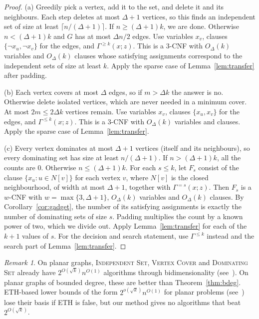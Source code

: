 \documentclass[11pt]{amsart}
\theoremstyle{definition}
\theoremstyle{remark}
\newtheorem{remark}[theorem]{Remark}
\newcommand{\VC}{\textup{\textsc{Vertex Cover}}}
\newcommand{\IS}{\textup{\textsc{Independent Set}}}
\newcommand{\DS}{\textup{\textsc{Dominating Set}}}
\begin{document}
\begin{proof}
(a) Greedily pick a vertex, add it to the set, and delete it and its neighbours. Each step deletes at most $\Delta+1$ vertices, so this finds an independent set of size at least $\lceil n/(\Delta+1)\rceil$. If $n\ge(\Delta+1)k$, we are done. Otherwise $n<(\Delta+1)k$ and $G$ has at most $\Delta n/2$ edges. Use variables $x_v$, clauses $\{\neg x_u,\neg x_v\}$ for the edges, and $\Gamma^{\ge k}(x;z)$. This is a $3$-CNF with $O_\Delta(k)$ variables and $O_\Delta(k)$ clauses whose satisfying assignments correspond to the independent sets of size at least $k$. Apply the sparse case of Lemma~\ref{lem:transfer} after padding.

(b) Each vertex covers at most $\Delta$ edges, so if $m>\Delta k$ the answer is no. Otherwise delete isolated vertices, which are never needed in a minimum cover. At most $2m\le 2\Delta k$ vertices remain. Use variables $x_v$, clauses $\{x_u,x_v\}$ for the edges, and $\Gamma^{\le k}(x;z)$. This is a $3$-CNF with $O_\Delta(k)$ variables and clauses. Apply the sparse case of Lemma~\ref{lem:transfer}.

(c) Every vertex dominates at most $\Delta+1$ vertices (itself and its neighbours), so every dominating set has size at least $n/(\Delta+1)$. If $n>(\Delta+1)k$, all the counts are $0$. Otherwise $n\le(\Delta+1)k$. For each $s\le k$, let $F_s$ consist of the clause $\{x_u:u\in N[v]\}$ for each vertex $v$, where $N[v]$ is the closed neighbourhood, of width at most $\Delta+1$, together with $\Gamma^{=s}(x;z)$. Then $F_s$ is a $w$-CNF with $w=\max\{3,\Delta+1\}$, $O_\Delta(k)$ variables and $O_\Delta(k)$ clauses. By Corollary~\ref{cor:gadget}, the number of its satisfying assignments is exactly the number of dominating sets of size $s$. Padding multiplies the count by a known power of two, which we divide out. Apply Lemma~\ref{lem:transfer} for each of the $k+1$ values of $s$. For the decision and search statement, use $\Gamma^{\le k}$ instead and the search part of Lemma~\ref{lem:transfer}.
\end{proof}

\begin{remark}
On planar graphs, \IS, \VC{} and \DS{} already have $2^{O(\sqrt k)}n^{O(1)}$ algorithms through bidimensionality (see~\cite[Chapter~7]{CFK15}). On planar graphs of bounded degree, these are better than Theorem~\ref{thm:bdeg}. ETH-based lower bounds of the form $2^{o(\sqrt k)}n^{O(1)}$ for planar problems (see~\cite[Chapter~14]{CFK15}) lose their basis if ETH is false, but our method gives no algorithms that beat $2^{O(\sqrt k)}$.
\end{remark}
\end{document}
